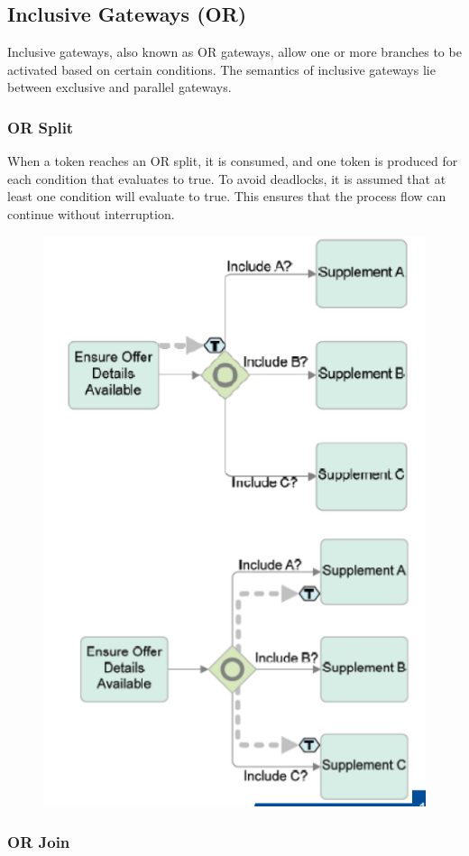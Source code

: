 \subsection{Inclusive Gateways (OR)}

Inclusive gateways, also known as OR gateways, allow one or more branches to be activated based on certain conditions. The semantics of inclusive gateways lie between exclusive and parallel gateways.

\subsubsection{OR Split}

When a token reaches an OR split, it is consumed, and one token is produced for each condition that evaluates to true. To avoid deadlocks, it is assumed that at least one condition will evaluate to true. This ensures that the process flow can continue without interruption.
\begin{figure}[h!]
    \centering
    \includegraphics[width=0.75\linewidth]{capitolo 9/9.png}
\end{figure}
\subsubsection{OR Join}

